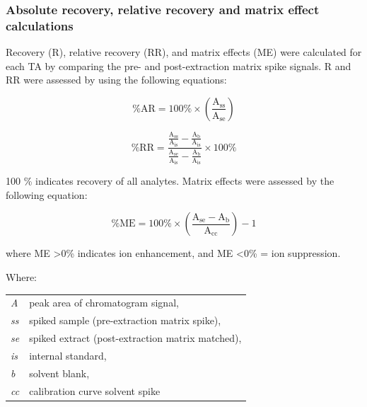 \subsubsection{Absolute recovery, relative recovery and matrix effect calculations}
Recovery (R), relative recovery (RR), and matrix effects (ME) were calculated for each TA by comparing the pre- and post-extraction matrix spike signals. R and RR were assessed by using the following equations:

\begin{equation}
    \label{eq:Recovery}
    \mathrm{\% AR  = 100 \% \times \left ( \frac{A_{ss}}{A_{se}} \right ) }
\end{equation}

\begin{equation}
    \label{eq:relativeRecovery}
    \mathrm{\% RR = \frac{\frac{A_{ss}}{A_{is}}-\frac{A_{b}}{A_{is}}}{\frac{A_{se}}{A_{is}}-\frac{A_{b}}{A_{is}}}\times 100 \% }
\end{equation}

100 \% indicates recovery of all analytes. Matrix effects were assessed by the following equation:

\begin{equation}
    \label{eq:ME}
    \mathrm{\% ME = 100 \% \times \left(\frac{A_{se} - A_b}{A_{cc}}\right )-1 }
\end{equation}

where ME \textgreater 0\% indicates ion enhancement, and ME \textless 0\% = ion suppression.

Where: \newline
\newline
\begin{tabular}{p{1cm}p{20cm}}
    \textit{A}   & peak area of chromatogram signal, \\
    \textit{ss}  & spiked sample (pre-extraction matrix spike), \\
    \textit{se}  & spiked extract (post-extraction matrix matched), \\
    \textit{is}  & internal standard, \\
    \textit{b}   & solvent blank, \\
    \textit{cc}  & calibration curve solvent spike \\
\end{tabular} \\


